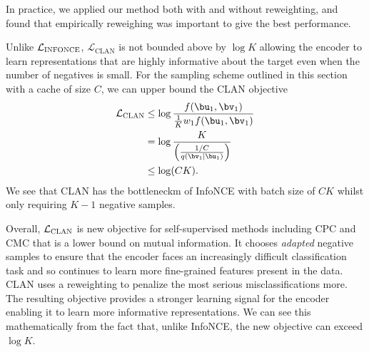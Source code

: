 In practice, we applied our method both with and without reweighting, and found that empirically reweighing was important to give the best performance.

Unlike $\mathcal{L}_\textsc{INFONCE}$, $\mathcal{L}_\text{CLAN}$ is not bounded above by $\log K$ allowing the encoder to learn representations that are highly informative about the target even when the number of negatives is small. For the sampling scheme outlined in this section with a cache of size $C$, we can upper bound the CLAN objective
\begin{align}
\mathcal{L}_\textsc{CLAN} & \le \log \frac{f(\bu_1, \bv_1)}{\frac{1}{K}w_1 f(\bu_1,\bv_1)} \\
&= \log \frac{K}{\left(\frac{1/C}{q(\bv_1\mid \bu_1)}\right)} \\
& \le \log(CK).
\end{align}
We see that CLAN has the bottleneckm of InfoNCE with batch size of $CK$ whilst only requiring $K-1$ negative samples.

Overall, $\mathcal{L}_\textsc{CLAN}$ is new objective for self-supervised methods including CPC and CMC that is a lower bound on mutual information. It chooses \textit{adapted} negative samples to ensure that the encoder faces an increasingly difficult classification task and so continues to learn more fine-grained features present in the data. CLAN uses a reweighting to penalize the most serious misclassifications more. The resulting objective provides a stronger learning signal for the encoder enabling it to learn more informative representations. We can see this mathematically from the fact that, unlike InfoNCE, the new objective can exceed $\log K$.

